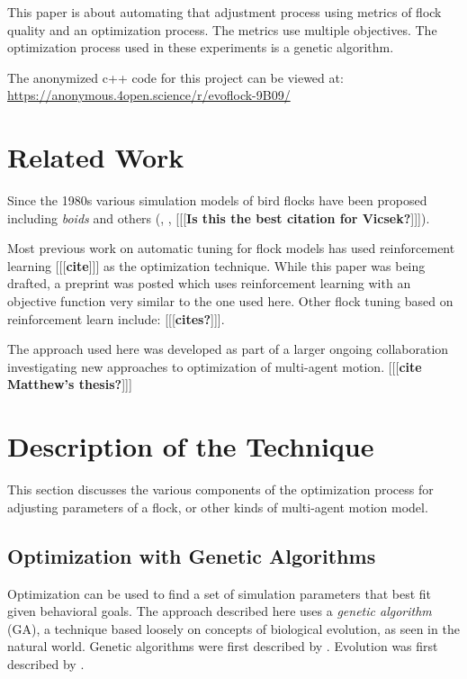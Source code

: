 \documentclass[letterpaper]{article}
\begin{document}
This paper is about automating that adjustment process using metrics of flock quality and an optimization process. The metrics use multiple objectives. The optimization process used in these experiments is a genetic algorithm.

The anonymized c++ code for this project can be viewed at:
\scriptsize
\url{https://anonymous.4open.science/r/evoflock-9B09/}
\normalsize

\section{Related Work}
\label{sec:related}

Since the 1980s various simulation models of bird flocks have been proposed including \textit{boids} \citep{reynolds_flocks_1987} and others (\citet{aoki_simulation_1982}, \citet{cucker_emergent_2007}, \citet{bhattacharya_collective_2010} [[[\textbf{Is this the best citation for Vicsek?}]]]).

Most previous work on automatic tuning for flock models has used reinforcement learning [[[\textbf{cite}]]] as the optimization technique. While this paper was being drafted, a preprint was posted \citep{brambati_learning_2025} which uses reinforcement learning with an objective function very similar to the one used here. Other flock tuning based on reinforcement learn include:
[[[\textbf{cites?}]]].


The approach used here was developed as part of a larger ongoing collaboration investigating new approaches to optimization of multi-agent motion. [[[\textbf{cite Matthew's thesis?}]]]

\section{Description of the Technique}
\label{sec:Description}

This section discusses the various components of the optimization process for adjusting parameters of a flock, or other kinds of multi-agent motion model.

\subsection{Optimization with Genetic Algorithms}
\label{subsec:Optimization_with_GA}

Optimization can be used to find a set of simulation parameters that best fit given behavioral goals. The approach described here uses a \textit{genetic algorithm} (GA), a technique based loosely on concepts of biological evolution, as seen in the natural world. Genetic algorithms were first described by \citet{holland_adaptation_1975}. Evolution was first described by \citet{darwin_origin_1859}.
\end{document}
